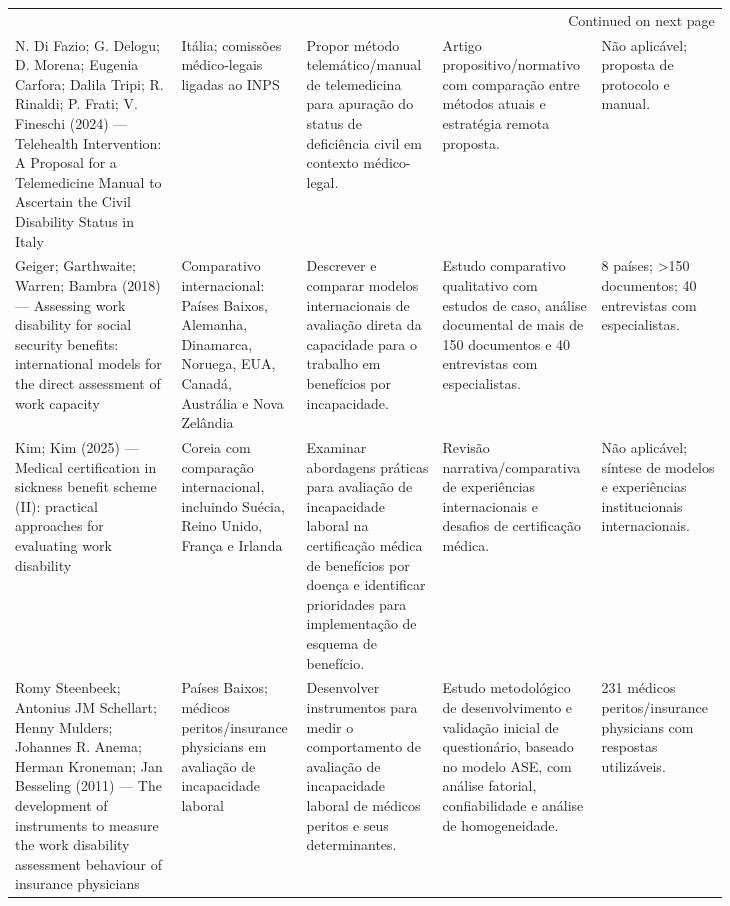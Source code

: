 \documentclass[12pt,a4paper]{article}
\begin{document}
\begin{landscape}
\begin{longtable}{p{0.22\linewidth}p{0.11\linewidth}p{0.17\linewidth}p{0.17\linewidth}p{0.16\linewidth}}
\hline
\endhead
\hline\multicolumn{5}{r}{Continued on next page} \\
\endfoot
\endlastfoot
\hline
N. Di Fazio; G. Delogu; D. Morena; Eugenia Carfora; Dalila Tripi; R. Rinaldi; P. Frati; V. Fineschi (2024) — Telehealth Intervention: A Proposal for a Telemedicine Manual to Ascertain the Civil Disability Status in Italy & Itália; comissões médico-legais ligadas ao INPS & Propor método telemático/manual de telemedicina para apuração do status de deficiência civil em contexto médico-legal. & Artigo propositivo/normativo com comparação entre métodos atuais e estratégia remota proposta. & Não aplicável; proposta de protocolo e manual.\\
Geiger; Garthwaite; Warren; Bambra (2018) — Assessing work disability for social security benefits: international models for the direct assessment of work capacity & Comparativo internacional: Países Baixos, Alemanha, Dinamarca, Noruega, EUA, Canadá, Austrália e Nova Zelândia & Descrever e comparar modelos internacionais de avaliação direta da capacidade para o trabalho em benefícios por incapacidade. & Estudo comparativo qualitativo com estudos de caso, análise documental de mais de 150 documentos e 40 entrevistas com especialistas. & 8 países; >150 documentos; 40 entrevistas com especialistas.\\
Kim; Kim (2025) — Medical certification in sickness benefit scheme (II): practical approaches for evaluating work disability & Coreia com comparação internacional, incluindo Suécia, Reino Unido, França e Irlanda & Examinar abordagens práticas para avaliação de incapacidade laboral na certificação médica de benefícios por doença e identificar prioridades para implementação de esquema de benefício. & Revisão narrativa/comparativa de experiências internacionais e desafios de certificação médica. & Não aplicável; síntese de modelos e experiências institucionais internacionais.\\
Romy Steenbeek; Antonius JM Schellart; Henny Mulders; Johannes R. Anema; Herman Kroneman; Jan Besseling (2011) — The development of instruments to measure the work disability assessment behaviour of insurance physicians & Países Baixos; médicos peritos/insurance physicians em avaliação de incapacidade laboral & Desenvolver instrumentos para medir o comportamento de avaliação de incapacidade laboral de médicos peritos e seus determinantes. & Estudo metodológico de desenvolvimento e validação inicial de questionário, baseado no modelo ASE, com análise fatorial, confiabilidade e análise de homogeneidade. & 231 médicos peritos/insurance physicians com respostas utilizáveis.\\

\end{longtable}
\end{landscape}
\end{document}
